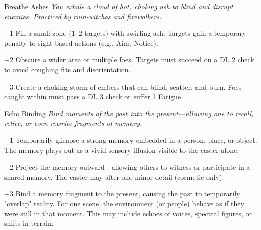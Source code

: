 \begin{WyrdSpell}[Ashcraft]{Breathe Ashes}
\textit{You exhale a cloud of hot, choking ash to blind and disrupt enemies. Practiced by ruin-witches and firewalkers.}
    \begin{WyrdSpellBlock}
        \item[+1] Fill a small zone (1–2 targets) with swirling ash. Targets gain a temporary penalty to sight-based actions (e.g., Aim, Notice).
        \item[+2] Obscure a wider area or multiple foes. Targets must succeed on a DL 2 check to avoid coughing fits and disorientation.
        \item[+3] Create a choking storm of embers that can blind, scatter, and burn. Foes caught within must pass a DL 3 check or suffer 1 Fatigue.
    \end{WyrdSpellBlock}
\end{WyrdSpell}

\begin{WyrdSpell}[Bloodbinding]{Echo Binding}\label{spell:echo-binding}
    \textit{Bind moments of the past into the present—allowing one to recall, relive, or even rewrite fragments of memory.}
    
    \begin{WyrdSpellBlock}
        \item[+1] Temporarily glimpse a strong memory embedded in a person, place, or object. The memory plays out as a vivid sensory illusion visible to the caster alone.
        
        \item[+2] Project the memory outward—allowing others to witness or participate in a shared memory. The caster may alter one minor detail (cosmetic only).
        
        \item[+3] Bind a memory fragment to the present, causing the past to temporarily "overlap" reality. For one scene, the environment (or people) behave as if they were still in that moment. This may include echoes of voices, spectral figures, or shifts in terrain.
    \end{WyrdSpellBlock}
\end{WyrdSpell}

